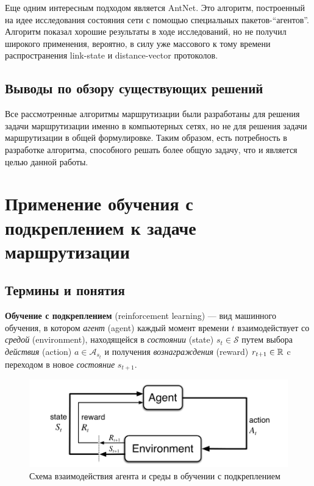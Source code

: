 \documentclass[specification, annotation]{itmo-student-thesis}
\begin{document}
Еще одним интересным подходом является AntNet\cite{di1998antnet}. Это алгоритм,
построенный на идее исследования состояния сети с помощью специальных
пакетов-``агентов''. Алгоритм показал хорошие результаты в ходе исследований, но
не получил широкого применения, вероятно, в силу уже массового к тому времени
распространения link-state и distance-vector протоколов.

\subsection{Выводы по обзору существующих решений}

Все рассмотренные алгоритмы маршрутизации были разработаны для
решения задачи маршрутизации именно в компьютерных сетях, но не для решения
задачи маршрутизации в общей формулировке. Таким образом, есть потребность в
разработке алгоритма, способного решать более общую задачу, что и является целью
данной работы.

\section{Применение обучения с подкреплением к задаче маршрутизации}

\subsection{Термины и понятия}

\textbf{Обучение с подкреплением} (reinforcement learning) --- вид машинного
обучения, в котором \textit{агент} (agent) каждый момент времени $t$
взаимодействует со \textit{средой} (environment), находящейся в
\textit{состоянии} (state) $s_t \in \mathcal{S}$ путем выбора
\textit{действия} (action) $a \in \mathcal{A}_{s_t}$ и получения
\textit{вознаграждения} (reward) $r_{t+1} \in \Bbb{R}$ c переходом в новое
\textit{состояние} $s_{t+1}$.

\begin{figure}[!h]
  \caption{Схема взаимодействия агента и среды в обучении с подкреплением}\label{rl-scheme}
  \centering
  \includegraphics[scale=0.5]{rl-scheme}
\end{figure}
\end{document}
